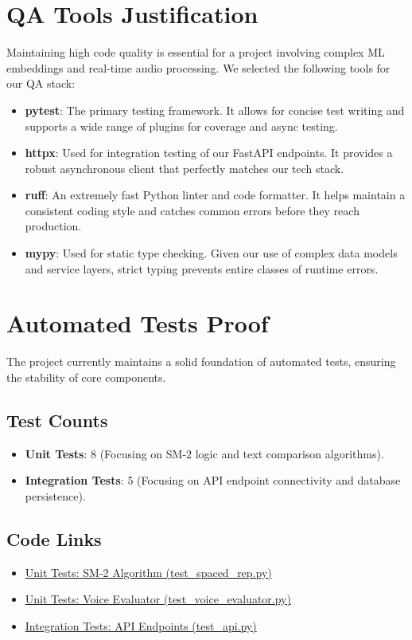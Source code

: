 \documentclass[12pt,a4paper]{article}
\begin{document}
\section{QA Tools Justification}
Maintaining high code quality is essential for a project involving complex ML embeddings and real-time audio processing. We selected the following tools for our QA stack:

\begin{itemize}
    \item \textbf{pytest}: The primary testing framework. It allows for concise test writing and supports a wide range of plugins for coverage and async testing.
    \item \textbf{httpx}: Used for integration testing of our FastAPI endpoints. It provides a robust asynchronous client that perfectly matches our tech stack.
    \item \textbf{ruff}: An extremely fast Python linter and code formatter. It helps maintain a consistent coding style and catches common errors before they reach production.
    \item \textbf{mypy}: Used for static type checking. Given our use of complex data models and service layers, strict typing prevents entire classes of runtime errors.
\end{itemize}

\section{Automated Tests Proof}
The project currently maintains a solid foundation of automated tests, ensuring the stability of core components.

\subsection{Test Counts}
\begin{itemize}
    \item \textbf{Unit Tests}: 8 (Focusing on SM-2 logic and text comparison algorithms).
    \item \textbf{Integration Tests}: 5 (Focusing on API endpoint connectivity and database persistence).
\end{itemize}

\subsection{Code Links}
\begin{itemize}
    \item \href{https://github.com/Potter32111/poetry-recommender/tree/main/backend/tests/test_spaced_rep.py}{Unit Tests: SM-2 Algorithm (test\_spaced\_rep.py)}
    \item \href{https://github.com/Potter32111/poetry-recommender/tree/main/backend/tests/test_voice_evaluator.py}{Unit Tests: Voice Evaluator (test\_voice\_evaluator.py)}
    \item \href{https://github.com/Potter32111/poetry-recommender/tree/main/backend/tests/test_api.py}{Integration Tests: API Endpoints (test\_api.py)}
\end{itemize}
\end{document}
